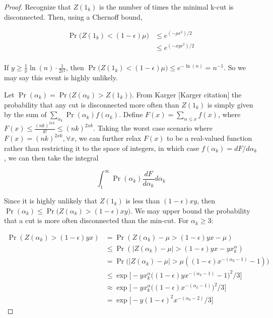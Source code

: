 \documentclass{acm_proc_article-sp}
\begin{document}
\begin{proof}
Recognize that $Z(1_k)$ is the number of times the minimal k-cut is disconnected. Then, using a Chernoff bound, 

\begin{align*}
\Pr \bigg(Z(1_k) < (1-\epsilon) \mu \bigg) &\leq e^{(-\mu \epsilon^2)/2} \\
&\leq e^{(-xy \epsilon^2)/2} \\
\end{align*}

If $y \geq \frac{1}{x} \ln(n) \cdot \frac{1}{2\epsilon^2}$, then $\Pr \bigg(Z(1_k) < (1-\epsilon)\mu \bigg) \leq e^{-\ln(n)} = n^{-1}$. So we may say this event is highly unlikely. 

Let $\Pr(\alpha_k) = \Pr \bigg( Z(\alpha_k) > Z(1_k) \bigg)$. From Karger [Karger citation] the probability that any cut is disconnected more often than $Z(1_k)$ is simply given by the sum of $\sum_{\alpha_k} \Pr(\alpha_k) f(\alpha_k)$. Define $F(x) = \sum_{\alpha \leq x} f(x)$, where $F(x) \leq \frac{(nk)^{2 xk}}{k!} \leq (nk)^{2xk}$. Taking the worst case scenario where $F(x) = (nk)^{2xk}, \forall x$, we can further relax $F(x)$ to be a real-valued function rather than restricting it to the space of integers, in which case $f(\alpha_k) = dF/d \alpha_k$, we can then take the integral

\[
\int_{1}^\infty \Pr(\alpha_k) \frac{dF}{d\alpha_k} d\alpha_k
\]

Since it is highly unlikely that $Z(1_k)$ is less than $(1-\epsilon)xy$, then $\Pr(\alpha_k) \leq \Pr \bigg(Z(\alpha_k) > (1-\epsilon)xy \bigg)$. We may upper bound the probability that a cut is more often disconnected than the min-cut. For $\alpha_k \geq 3$:

\begin{align*}
\Pr(Z(\alpha_k) > (1 - \epsilon)yx) &= \Pr(Z(\alpha_k) - \mu > (1 - \epsilon)yx - \mu) \\
&\leq \Pr(|Z(\alpha_k)-\mu| > (1-\epsilon)yx - yx^\alpha_k) \\
&= \Pr \bigg(|Z(\alpha_k)-\mu| > \mu ((1-\epsilon) x^{-(\alpha_k-1)}-1)\bigg) \\
&\leq \exp \bigg[-yx^\alpha_k \bigg((1-\epsilon)yx^{-(\alpha_k-1)}-1\bigg)^2/3\bigg] \\
&\approx \exp \bigg[-yx^\alpha_k \bigg((1-\epsilon)x^{-(\alpha_k - 1)}\bigg)^2/3\bigg] \\
&= \exp \bigg[-y (1-\epsilon)^2 x^{-(\alpha_k-2)}/3\bigg]
\end{align*}


\end{proof}
\end{document}
